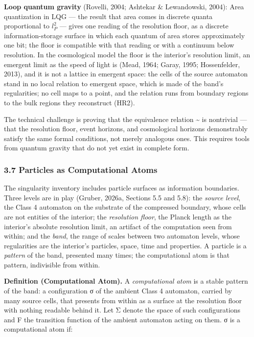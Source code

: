 \documentclass[
]{article}
\begin{document}
\textbf{Loop quantum gravity} (Rovelli, 2004; Ashtekar \& Lewandowski,
2004): Area quantization in LQG --- the result that area comes in
discrete quanta proportional to \(l_P^2\) --- gives one reading of the
resolution floor, as a discrete information-storage surface in which
each quantum of area stores approximately one bit; the floor is
compatible with that reading or with a continuum below resolution. In
the cosmological model the floor is the interior's resolution limit, an
emergent limit as the speed of light is (Mead, 1964; Garay, 1995;
Hossenfelder, 2013), and it is not a lattice in emergent space: the
cells of the source automaton stand in no local relation to emergent
space, which is made of the band's regularities; no cell maps to a
point, and the relation runs from boundary regions to the bulk regions
they reconstruct (HR2).

The technical challenge is proving that the equivalence relation
\textasciitilde{} is nontrivial --- that the resolution floor, event
horizons, and cosmological horizons demonstrably satisfy the same formal
conditions, not merely analogous ones. This requires tools from quantum
gravity that do not yet exist in complete form.

\hypertarget{particles-as-computational-atoms}{%
\subsubsection{3.7 Particles as Computational
Atoms}\label{particles-as-computational-atoms}}

The singularity inventory includes particle surfaces as information
boundaries. Three levels are in play (Gruber, 2026a, Sections 5.5 and
5.8): the \emph{source level}, the Class 4 automaton on the substrate of
the compressed boundary, whose cells are not entities of the interior;
the \emph{resolution floor}, the Planck length as the interior's
absolute resolution limit, an artifact of the computation seen from
within; and the \emph{band}, the range of scales between two automaton
levels, whose regularities are the interior's particles, space, time and
properties. A particle is a \emph{pattern} of the band, presented many
times; the computational atom is that pattern, indivisible from within.

\textbf{Definition (Computational Atom).} A \emph{computational atom} is
a stable pattern of the band: a configuration σ of the ambient Class 4
automaton, carried by many source cells, that presents from within as a
surface at the resolution floor with nothing readable behind it. Let Σ
denote the space of such configurations and F the transition function of
the ambient automaton acting on them. σ is a computational atom if:
\end{document}
